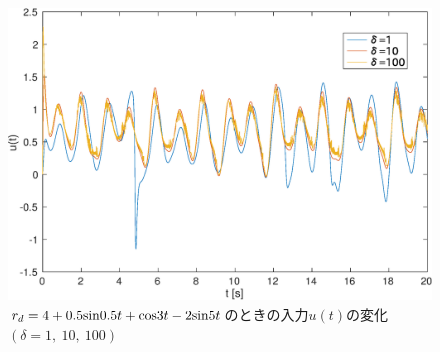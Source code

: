 \documentclass[a4paper,12pt]{jarticle}
\begin{document}
\begin{figure}[H]
 \begin{center}
  \includegraphics[scale=0.5]{../figure/eps/input/2/u.eps}
  \caption{$ r_d = 4 + 0.5{\rm sin}0.5t + {\rm cos}3t -2{\rm sin}5t $のときの入力$ u(t) $の変化$(\delta = 1, ~ 10, ~ 100 )$}
  \label{u2}
 \end{center}
\end{figure}
\end{document}
